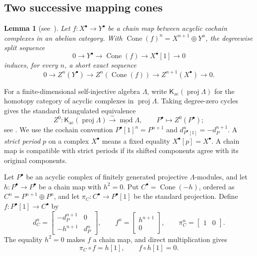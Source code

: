 \documentclass[a4paper,11pt,reqno]{amsart}
\newtheorem{lemma}[lemma]{Lemma}
\theoremstyle{definition}
\theoremstyle{plain}
\numberwithin{equation}{section}
\begin{document}
\subsection{Two successive mapping cones}

\begin{lemma}[{\normalfont see~\cite[Lemma~1.3.2 and
Section~1.5]{Weibel1994}}]
\label{lem:cycles-split-cones}
Let \(f:X^\bullet\to Y^\bullet\) be a chain map between acyclic cochain
complexes in an abelian category.  With
\(\operatorname{Cone}(f)^n=X^{n+1}\oplus Y^n\), the degreewise split
sequence
\[
0\longrightarrow Y^\bullet\longrightarrow\operatorname{Cone}(f)
 \longrightarrow X^\bullet[1]\longrightarrow0
\]
induces, for every \(n\), a short exact sequence
\begin{equation}
\label{eq:cycles-of-cone}
0\longrightarrow Z^n(Y^\bullet)\longrightarrow
 Z^n(\operatorname{Cone}(f))
 \longrightarrow Z^{n+1}(X^\bullet)\longrightarrow0.
\end{equation}
\end{lemma}

For a finite-dimensional self-injective algebra \(\Lambda\), write
\(\mathsf K_{\mathrm{ac}}(\operatorname{proj}\Lambda)\) for the homotopy
category of acyclic complexes in \(\operatorname{proj}\Lambda\).
Taking degree-zero cycles gives the standard triangulated equivalence
\[
 Z^0:\mathsf K_{\mathrm{ac}}(\operatorname{proj}\Lambda)
 \xrightarrow{\sim}\underline{\operatorname{mod}}\Lambda,
 \qquad P^\bullet\longmapsto Z^0(P^\bullet);
\]
see \cite[Sections~I.2--I.3]{Happel1988}.  We use the cochain convention
\(P^\bullet[1]^n=P^{n+1}\) and
\(d_{P^\bullet[1]}^n=-d_P^{n+1}\).  A \emph{strict period} \(p\) on a
complex \(X^\bullet\) means a fixed equality
\(X^\bullet[p]=X^\bullet\).  A chain map is compatible with strict
periods if its shifted components agree with its original components.

Let \(P^\bullet\) be an acyclic complex of finitely generated projective
\(\Lambda\)-modules, and let \(h:P^\bullet\to P^\bullet\) be a chain map
with \(h^2=0\).  Put
\(C^\bullet=\operatorname{Cone}(-h)\), ordered as
\(C^n=P^{n+1}\oplus P^n\), and let
\(\pi_C:C^\bullet\to P^\bullet[1]\) be the standard projection.  Define
\(f:P^\bullet[1]\to C^\bullet\) by
\begin{equation}
\label{eq:cone-sign-certificate}
 d_C^n=\begin{bmatrix}-d_P^{n+1}&0\\-h^{n+1}&d_P^n\end{bmatrix},
 \qquad
 f^n=\begin{bmatrix}h^{n+1}\\0\end{bmatrix},
 \qquad
 \pi_C^n=\begin{bmatrix}1&0\end{bmatrix}.
\end{equation}
The equality \(h^2=0\) makes \(f\) a chain map, and direct multiplication
gives
\[
 \pi_C\circ f=h[1],
 \qquad
 f\circ h[1]=0.
\]
\end{document}
